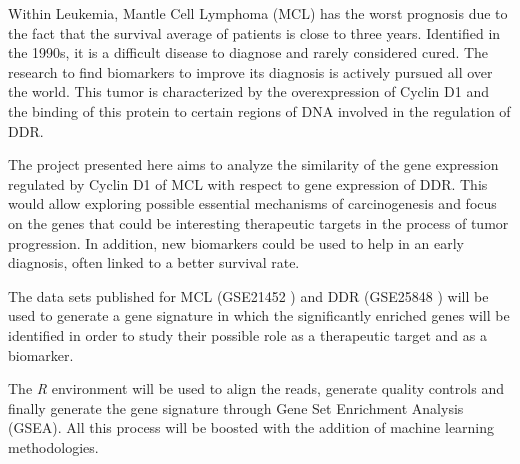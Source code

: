 Within Leukemia, Mantle Cell Lymphoma (MCL) has the worst prognosis due to the fact that the survival average of patients is close to three years. Identified in the 1990s, it is a difficult disease to diagnose and rarely considered cured. The research to find biomarkers to improve its diagnosis is actively pursued all over the world. This tumor is characterized by the overexpression of Cyclin D1 and the binding of this protein to certain regions of DNA involved in the regulation of DDR.

The project presented here aims to analyze the similarity of the gene expression regulated by Cyclin D1 of MCL with respect to gene expression of DDR. This would allow exploring possible essential mechanisms of carcinogenesis and focus on the genes that could be interesting therapeutic targets in the process of tumor progression. In addition, new biomarkers could be used to help in an early diagnosis, often linked to a better survival rate.

The data sets published for MCL (GSE21452 \cite{mclData:2011}) and DDR (GSE25848 \cite{ddrData:2011}) will be used to generate a gene signature in which the significantly enriched genes will be identified in order to study their possible role as a therapeutic target and as a biomarker.

The \textit{R} environment will be used to align the reads, generate quality controls and finally generate the gene signature through Gene Set Enrichment Analysis (GSEA). All this process will be boosted with the addition of machine learning methodologies.
